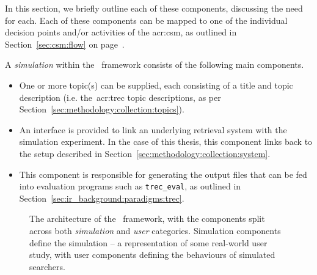 In this section, we briefly outline each of these components, discussing the need for each. Each of these components can be mapped to one of the individual decision points and/or activities of the \gls{acr:csm}, as outlined in Section~\ref{sec:csm:flow} on page~\pageref{sec:csm:flow}.

A \emph{simulation} within the \simiir~framework consists of the following main components.

\begin{itemize}
    \item{ One or more topic(s) can be supplied, each consisting of a title and topic description (i.e. the~\gls{acr:trec} topic descriptions, as per Section~\ref{sec:methodology:collection:topics}).}
    \item{ An interface is provided to link an underlying retrieval system with the simulation experiment. In the case of this thesis, this component links back to the setup described in Section~\ref{sec:methodology:collection:system}.}
    \item{ This component is responsible for generating the output files that can be fed into evaluation programs such as \texttt{trec\_eval}, as outlined in Section~\ref{sec:ir_background:paradigms:trec}.}
\end{itemize}

\begin{figure}[t!]
    \centering
    \caption[Architecture of the \simiir~framework]{The architecture of the \simiir~framework, with the components split across both \emph{simulation} and \emph{user} categories. Simulation components define the simulation – a representation of some real-world user study, with user components defining the behaviours of simulated searchers.}
    \label{fig:simiir}
\end{figure}

